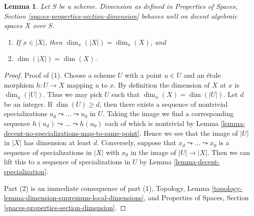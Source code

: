\documentclass{stacks-project}
\theoremstyle{plain}
\newtheorem{lemma}[subsection]{Lemma}
\theoremstyle{definition}
\theoremstyle{remark}
\numberwithin{equation}{subsection}
\begin{document}
\begin{lemma}
\label{lemma-dimension-decent-space}
Let $S$ be a scheme. Dimension as defined in
Properties of Spaces, Section \ref{spaces-properties-section-dimension}
behaves well on decent algebraic spaces $X$ over $S$.
\begin{enumerate}
\item If $x \in |X|$, then $\dim_x(|X|) = \dim_x(X)$, and
\item $\dim(|X|) = \dim(X)$.
\end{enumerate}
\end{lemma}

\begin{proof}
Proof of (1). Choose a scheme $U$ with a point $u \in U$
and an \'etale morphism $h : U \to X$ mapping $u$ to $x$.
By definition the dimension of $X$ at $x$ is $\dim_u(|U|)$.
Thus we may pick $U$ such that $\dim_x(X) = \dim(|U|)$.
Let $d$ be an integer. If $\dim(U) \geq d$, then
there exists a sequence of nontrivial specializations
$u_d \leadsto \ldots \leadsto u_0$ in $U$. Taking the image
we find a corresponding sequence
$h(u_d) \leadsto \ldots \leadsto h(u_0)$
each of which is nontrivial by
Lemma \ref{lemma-decent-no-specializations-map-to-same-point}.
Hence we see that the image of $|U|$ in $|X|$ has dimension at least $d$.
Conversely, suppose that $x_d \leadsto \ldots \leadsto x_0$ is a
sequence of specializations in $|X|$ with $x_0$ in the image of
$|U| \to |X|$. Then we can lift this to a sequence of specializations
in $U$ by Lemma \ref{lemma-decent-specialization}.

\medskip\noindent
Part (2) is an immediate consequence of part (1),
Topology, Lemma \ref{topology-lemma-dimension-supremum-local-dimensions},
and Properties of Spaces, Section \ref{spaces-properties-section-dimension}.
\end{proof}
\end{document}
